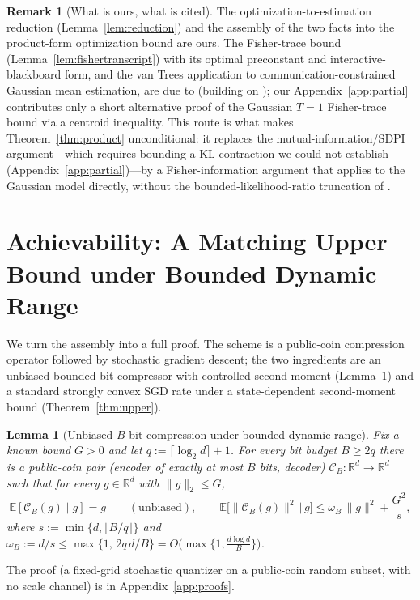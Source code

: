 \documentclass[11pt]{article}
\newtheorem{lemma}{Lemma}
\theoremstyle{definition}
\newtheorem{remark}{Remark}
\newcommand{\E}{\mathbb{E}}
\newcommand{\Ccal}{\mathcal{C}}
\newcommand{\Rbb}{\mathbb{R}}
\begin{document}
\begin{remark}[What is ours, what is cited]
The optimization-to-estimation reduction (Lemma~\ref{lem:reduction}) and the assembly of the two facts
into the product-form optimization bound are ours. The Fisher-trace bound
(Lemma~\ref{lem:fishertranscript}) with its optimal preconstant and interactive-blackboard form, and the
van Trees application to communication-constrained Gaussian mean estimation, are due to
\citet{barnes2021fisher} (building on \citealp{barneshanozgur2020,gilllevit1995}); our
Appendix~\ref{app:partial} contributes only a short alternative proof of the Gaussian $T=1$ Fisher-trace
bound via a centroid inequality. This route is what makes Theorem~\ref{thm:product} unconditional: it
replaces the mutual-information/SDPI argument---which requires bounding a KL contraction we could not
establish (Appendix~\ref{app:partial})---by a Fisher-information argument that applies to the Gaussian
model directly, without the bounded-likelihood-ratio truncation of \citet{braverman2016ddpi}.
\end{remark}

\section{Achievability: A Matching Upper Bound under Bounded Dynamic Range}
\label{sec:upper}

We turn the assembly into a full proof. The scheme is a public-coin compression operator followed by
stochastic gradient descent; the two ingredients are an unbiased bounded-bit compressor with controlled
second moment (Lemma~\ref{lem:compress}) and a standard strongly convex SGD rate under a state-dependent
second-moment bound (Theorem~\ref{thm:upper}).

\begin{lemma}[Unbiased $B$-bit compression under bounded dynamic range]
\label{lem:compress}
Fix a known bound $G>0$ and let $q:=\lceil\log_2 d\rceil+1$. For every bit budget $B\ge 2q$ there is a
public-coin pair (encoder of \emph{exactly} at most $B$ bits, decoder) $\Ccal_B:\Rbb^d\to\Rbb^d$ such
that for every $g\in\Rbb^d$ with $\|g\|_2\le G$,
\[
  \E[\Ccal_B(g)\mid g]=g\qquad(\text{unbiased}),\qquad
  \E\big[\|\Ccal_B(g)\|^2\,\big|\,g\big]\le \omega_B\,\|g\|^2+\frac{G^2}{s},
\]
where $s:=\min\{d,\lfloor B/q\rfloor\}$ and $\omega_B:=d/s\le\max\{1,\,2q\,d/B\}=O\!\big(\max\{1,\tfrac{d\log d}{B}\}\big)$.
\end{lemma}

\noindent The proof (a fixed-grid stochastic quantizer on a public-coin random subset, with no scale
channel) is in Appendix~\ref{app:proofs}.
\end{document}

